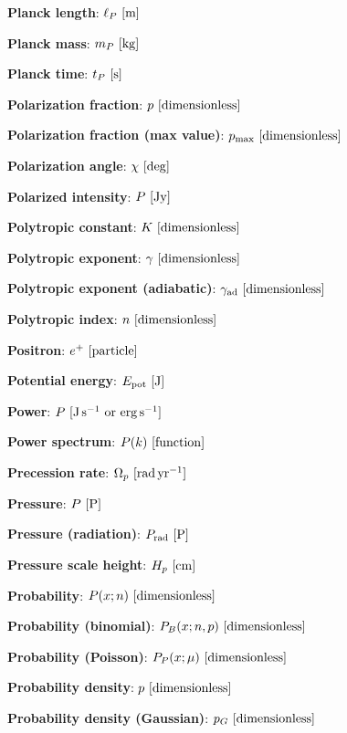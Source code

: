 \documentclass[a4paper,10pt]{article}
\begin{document}
{\noindent}\textbf{Planck length}: $\ell_P ~ [{\rm m}]$

{\noindent}\textbf{Planck mass}: $m_P ~ [{\rm kg}]$

{\noindent}\textbf{Planck time}: $t_P ~ [{\rm s}]$

{\noindent}\textbf{Polarization fraction}: $p ~ [{\rm dimensionless}]$

{\noindent}\textbf{Polarization fraction (max value)}: $p_\mathrm{max} ~ [{\rm dimensionless}]$

{\noindent}\textbf{Polarization angle}: $\chi ~ [{\rm deg}]$

{\noindent}\textbf{Polarized intensity}: $P ~ [{\rm Jy}]$

{\noindent}\textbf{Polytropic constant}: $K ~ [{\rm dimensionless}]$

{\noindent}\textbf{Polytropic exponent}: $\gamma ~ [{\rm dimensionless}]$

{\noindent}\textbf{Polytropic exponent (adiabatic)}: $\gamma_{\rm ad} ~ [{\rm dimensionless}]$

{\noindent}\textbf{Polytropic index}: $n ~ [{\rm dimensionless}]$

{\noindent}\textbf{Positron}: $e^+ ~ [{\rm particle}]$

{\noindent}\textbf{Potential energy}: $E_\mathrm{pot} ~ [{\rm J}]$

{\noindent}\textbf{Power}: $P ~ [{\rm J\,s^{-1}~{\rm or}~{\rm erg\,s^{-1}}}]$

{\noindent}\textbf{Power spectrum}: $P(k) ~ [{\rm function}]$

{\noindent}\textbf{Precession rate}: $\Omega_p ~ [{\rm rad\,yr^{-1}}]$

{\noindent}\textbf{Pressure}: $P ~ [{\rm P}]$

{\noindent}\textbf{Pressure (radiation)}: $P_{\rm rad} ~ [{\rm P}]$

{\noindent}\textbf{Pressure scale height}: $H_p ~ [{\rm cm}]$

{\noindent}\textbf{Probability}: $P(x;n) ~ [{\rm dimensionless}]$

{\noindent}\textbf{Probability (binomial)}: $P_B(x;n,p) ~ [{\rm dimensionless}]$

{\noindent}\textbf{Probability (Poisson)}: $P_P(x;\mu) ~ [{\rm dimensionless}]$

{\noindent}\textbf{Probability density}: $p ~ [{\rm dimensionless}]$

{\noindent}\textbf{Probability density (Gaussian)}: $p_G ~ [{\rm dimensionless}]$
\end{document}
